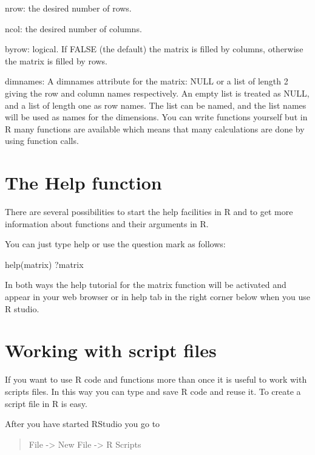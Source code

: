 \documentclass[
]{book}
\newenvironment{Shaded}{\begin{snugshade}}{\end{snugshade}}
\newcommand{\FunctionTok}[1]{\textcolor[rgb]{0.00,0.00,0.00}{#1}}
\newcommand{\NormalTok}[1]{#1}
\begin{document}
nrow: the desired number of rows.

ncol: the desired number of columns.

byrow: logical. If FALSE (the default) the matrix is filled by columns, otherwise the matrix is filled by rows.

dimnames: A dimnames attribute for the matrix: NULL or a list of length 2 giving the row and column names respectively. An empty list is treated as NULL, and a list of length one as row names. The list can be named, and the list names will be used as names for the dimensions.
You can write functions yourself but in R many functions are available which means that many calculations are done by using function calls.

\hypertarget{the-help-function}{%
\section{The Help function}\label{the-help-function}}

There are several possibilities to start the help facilities in R and to get more information about functions and their arguments in R.

You can just type help or use the question mark as follows:

\begin{Shaded}
\begin{Highlighting}[]
\FunctionTok{help}\NormalTok{(matrix)}
\NormalTok{?matrix}
\end{Highlighting}
\end{Shaded}

In both ways the help tutorial for the matrix function will be activated and appear in your web browser or in help tab in the right corner below when you use R studio.

\hypertarget{working-with-script-files}{%
\section{Working with script files}\label{working-with-script-files}}

If you want to use R code and functions more than once it is useful to work with scripts files. In this way you can type and save R code and reuse it. To create a script file in R is easy.

After you have started RStudio you go to

\begin{quote}
File -\textgreater{} New File -\textgreater{} R Scripts
\end{quote}
\end{document}

